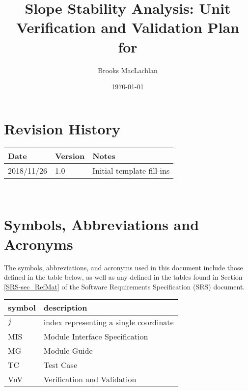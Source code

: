 \documentclass[12pt, titlepage]{article}
\begin{document}
\title{Slope Stability Analysis: Unit Verification and Validation Plan for 
\progname{}} 
\author{Brooks MacLachlan}
\date{\today}
	
\maketitle


\section{Revision History}

\begin{tabularx}{\textwidth}{p{3cm}p{2cm}X}
\toprule {\bf Date} & {\bf Version} & {\bf Notes}\\
\midrule
2018/11/26 & 1.0 & Initial template fill-ins\\
\bottomrule
\end{tabularx}

~\newpage

\tableofcontents

\listoftables


\listoffigures


\newpage

\section{Symbols, Abbreviations and Acronyms}

The symbols, abbreviations, and acronyms used in this document include those 
defined in the table below, as well as any defined in the tables found in 
Section \ref{SRS-sec_RefMat} of the Software Requirements Specification (SRS) 
document.
\newline

\renewcommand{\arraystretch}{1.2}
\begin{tabular}{l l} 
	\toprule		
	\textbf{symbol} & \textbf{description}\\
	\midrule 
	$j$ & index representing a single coordinate\\
	MIS & Module Interface Specification\\
	MG & Module Guide\\
	TC & Test Case\\
	VnV & Verification and Validation\\
	\bottomrule
\end{tabular}\\
\end{document}
